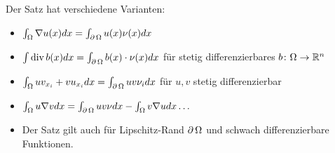 \begin{bem}\label{bem_14}
	Der Satz hat verschiedene Varianten: \marginnote{[14]}
	\begin{itemize}
		\item $\int_\Omega \nabla u(x) dx = \int_{\operatorname{\partial} \Omega} u(x) \nu(x) dx$
		\item $\int \operatorname{div} b(x) dx = \int_{\operatorname{\partial} \Omega} b(x) \cdot \nu(x) dx$ für stetig differenzierbares $b\colon \Omega \rightarrow \mathbb{R}^n$
		\item $\int_\Omega uv_{x_i} + vu_{x_i} dx = \int_{\operatorname{\partial} \Omega} uv \nu_i dx$ für $u,v$ stetig differenzierbar
		\item $\int_\Omega u \nabla v dx = \int_{\operatorname{\partial} \Omega} u v \nu dx - \int_\Omega v \nabla u dx \dots$
		\item Der Satz gilt auch für Lipschitz-Rand $\operatorname{\partial} \Omega$ und schwach differenzierbare Funktionen.
	\end{itemize}
\end{bem}
\newpage